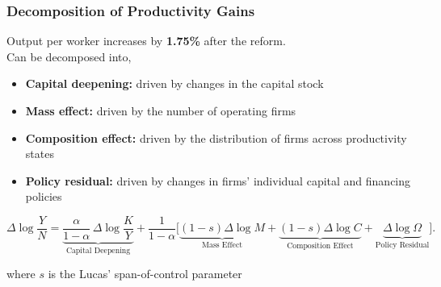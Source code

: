 \documentclass[aspectratio=169,xcolor=table]{beamer}
\begin{document}
\begin{frame}[label=Decomp_main] \frametitle{Decomposition of Productivity Gains  \hfill  \hyperlink{decompA}{}}

Output per worker increases by \textbf{1.75\%} after the reform. \vspace{3mm} \\

Can be decomposed into,
\begin{itemize} \small
    \item \textbf{Capital deepening:} driven by changes in the capital stock
    \item \textbf{Mass effect:} driven by the number of operating firms  
    \item \textbf{Composition effect:} driven by the distribution of firms across productivity states 
    \item \textbf{Policy residual:} driven by changes in firms’ individual capital and financing policies 
\end{itemize} \normalsize


\[
\Delta\log\frac{Y}{N}
= \underbrace{\frac{\alpha}{1-\alpha}\,\Delta\log\frac{K}{Y}}_{\text{Capital Deepening}}
+ \frac{1}{1-\alpha}\Big[
\underbrace{(1-s)\Delta\log M}_{\text{Mass Effect}} +  
\underbrace{(1-s)\Delta\log C}_{\text{Composition Effect}} + 
\underbrace{\Delta\log\Omega}_{\text{Policy Residual}}\Big].
\] 

\small where $s$ is the Lucas' span-of-control parameter



\end{frame}
\end{document}
